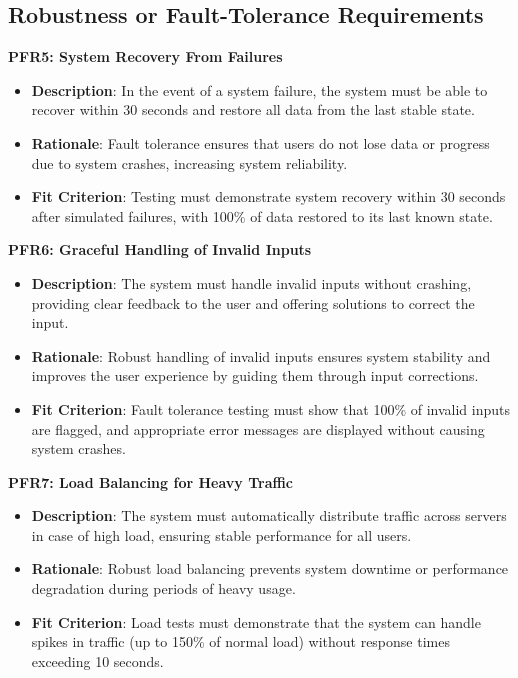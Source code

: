 \documentclass[12pt]{article}
\begin{document}
\subsection{Robustness or Fault-Tolerance Requirements}
\textbf{PFR5: System Recovery From Failures}
\begin{itemize}
    \item \textbf{Description}: In the event of a system failure, the system
    must be able to recover within 30 seconds and restore all data from the last
    stable state.
    \item \textbf{Rationale}: Fault tolerance ensures that users do not lose
    data or progress due to system crashes, increasing system reliability.
    \item \textbf{Fit Criterion}: Testing must demonstrate system recovery
    within 30 seconds after simulated failures, with 100\% of data restored to
    its last known state.
\end{itemize}
\textbf{PFR6: Graceful Handling of Invalid Inputs}
\begin{itemize}
    \item \textbf{Description}: The system must handle invalid inputs without
    crashing, providing clear feedback to the user and offering solutions to
    correct the input.
    \item \textbf{Rationale}: Robust handling of invalid inputs ensures system
    stability and improves the user experience by guiding them through input
    corrections.
    \item \textbf{Fit Criterion}: Fault tolerance testing must show that 100\%
    of invalid inputs are flagged, and appropriate error messages are displayed
    without causing system crashes.
\end{itemize}
\textbf{PFR7: Load Balancing for Heavy Traffic}
\begin{itemize}
    \item \textbf{Description}: The system must automatically distribute traffic
    across servers in case of high load, ensuring stable performance for all
    users.
    \item \textbf{Rationale}: Robust load balancing prevents system downtime or
    performance degradation during periods of heavy usage.
    \item \textbf{Fit Criterion}: Load tests must demonstrate that the system
    can handle spikes in traffic (up to 150\% of normal load) without response
    times exceeding 10 seconds.
\end{itemize}
\end{document}

